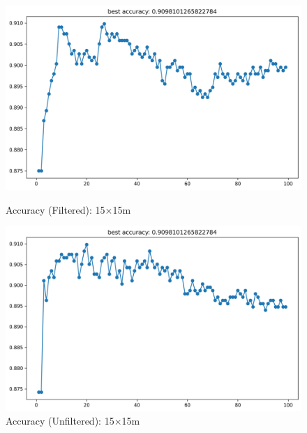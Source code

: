 \documentclass[runningheads]{llncs}
\begin{document}
\begin{figure}[H]
	\centering
	\begin{minipage}{0.49\textwidth}
		\centering
		\includegraphics[width=\textwidth]{figures/filtered/knn_acc_15.png}
		\caption*{Accuracy (Filtered): 15×15m}
	\end{minipage}
	\hfill
	\begin{minipage}{0.49\textwidth}
		\centering
		\includegraphics[width=\textwidth]{figures/unfiltered/knn_acc_15.png}
		\caption*{Accuracy (Unfiltered): 15×15m}
	\end{minipage}
\end{figure}
\end{document}
